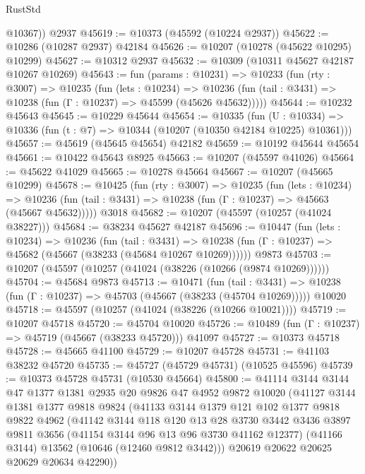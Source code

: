 \begin{lexlean}{RustStd}
\begin{coremodule}
        @10367))
    @2937
@45619 := @10373 (@45592 (@10224 @2937))
@45622 := @10286 (@10287 @2937) @42184
@45626 := @10207 (@10278 (@45622 @10295) @10299)
@45627 := @10312 @2937
@45632 := @10309 (@10311 @45627 @42187 @10267 @10269)
@45643 := fun (params : @10231) =>
  @10233
    (fun (rty : @3007) =>
    @10235
      (fun (lets : @10234) =>
      @10236 (fun (tail : @3431) => @10238 (fun (Γ : @10237) => @45599 (@45626 @45632)))))
@45644 := @10232 @45643
@45645 := @10229 @45644
@45654 := @10335
    (fun (U : @10334) => @10336 (fun (t : @7) => @10344 (@10207 (@10350 @42184 @10225) @10361)))
@45657 := @45619 (@45645 @45654) @42182
@45659 := @10192 @45644 @45654
@45661 := @10422 @45643 @8925
@45663 := @10207 (@45597 @41026)
@45664 := @45622 @41029
@45665 := @10278 @45664
@45667 := @10207 (@45665 @10299)
@45678 := @10425
    (fun (rty : @3007) =>
    @10235
      (fun (lets : @10234) =>
      @10236 (fun (tail : @3431) => @10238 (fun (Γ : @10237) => @45663 (@45667 @45632)))))
    @3018
@45682 := @10207 (@45597 (@10257 (@41024 @38227)))
@45684 := @38234 @45627 @42187
@45696 := @10447
    (fun (lets : @10234) =>
    @10236
      (fun (tail : @3431) =>
      @10238 (fun (Γ : @10237) => @45682 (@45667 (@38233 (@45684 @10267 @10269))))))
    @9873
@45703 := @10207 (@45597 (@10257 (@41024 (@38226 (@10266 (@9874 @10269))))))
@45704 := @45684 @9873
@45713 := @10471
    (fun (tail : @3431) => @10238 (fun (Γ : @10237) => @45703 (@45667 (@38233 (@45704 @10269)))))
    @10020
@45718 := @45597 (@10257 (@41024 (@38226 (@10266 @10021))))
@45719 := @10207 @45718
@45720 := @45704 @10020
@45726 := @10489 (fun (Γ : @10237) => @45719 (@45667 (@38233 @45720))) @41097
@45727 := @10373 @45718
@45728 := @45665 @41100
@45729 := @10207 @45728
@45731 := @41103 @38232 @45720
@45735 := @45727 (@45729 @45731) (@10525 @45596)
@45739 := @10373 @45728 @45731 (@10530 @45664)
@45800 := @41114
    @3144
    @3144
    @47
    @1377
    @1381
    @2935
    @20
    @9826
    @47
    @4952
    @9872
    @10020
    (@41127
      @3144
      @1381
      @1377
      @9818
      @9824
      (@41133
        @3144
        @1379
        @121
        @102
        @1377
        @9818
        @9822
        @4962
        (@41142
          @3144
          @118
          @120
          @13
          @28
          @3730
          @3442
          @3436
          @3897
          @9811
          @3656
          (@41154 @3144 @96 @13 @96 @3730 @41162 @12377)
          (@41166 @3144)
          @13562
          (@10646 (@12460 @9812 @3442)))
        @20619
        @20622
        @20625
        @20629
        @20634
        @42290))

\end{coremodule}
\end{lexlean}
